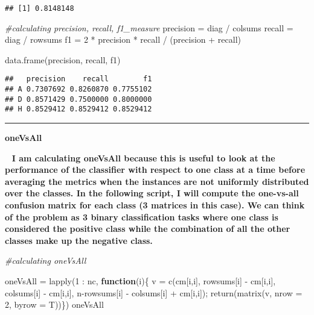 \documentclass[
]{article}
\newenvironment{Shaded}{\begin{snugshade}}{\end{snugshade}}
\newcommand{\AttributeTok}[1]{\textcolor[rgb]{0.77,0.63,0.00}{#1}}
\newcommand{\CommentTok}[1]{\textcolor[rgb]{0.56,0.35,0.01}{\textit{#1}}}
\newcommand{\ControlFlowTok}[1]{\textcolor[rgb]{0.13,0.29,0.53}{\textbf{#1}}}
\newcommand{\DecValTok}[1]{\textcolor[rgb]{0.00,0.00,0.81}{#1}}
\newcommand{\FunctionTok}[1]{\textcolor[rgb]{0.00,0.00,0.00}{#1}}
\newcommand{\NormalTok}[1]{#1}
\newcommand{\OtherTok}[1]{\textcolor[rgb]{0.56,0.35,0.01}{#1}}
\newcommand{\SpecialCharTok}[1]{\textcolor[rgb]{0.00,0.00,0.00}{#1}}
\begin{document}
\begin{verbatim}
## [1] 0.8148148
\end{verbatim}

\begin{Shaded}
\begin{Highlighting}[]
\CommentTok{\#calculating precision, recall, f1\_measure}
\NormalTok{precision }\OtherTok{=}\NormalTok{ diag }\SpecialCharTok{/}\NormalTok{ colsums }
\NormalTok{recall }\OtherTok{=}\NormalTok{ diag }\SpecialCharTok{/}\NormalTok{ rowsums }
\NormalTok{f1 }\OtherTok{=} \DecValTok{2} \SpecialCharTok{*}\NormalTok{ precision }\SpecialCharTok{*}\NormalTok{ recall }\SpecialCharTok{/}\NormalTok{ (precision }\SpecialCharTok{+}\NormalTok{ recall) }

\FunctionTok{data.frame}\NormalTok{(precision, recall, f1) }
\end{Highlighting}
\end{Shaded}

\begin{verbatim}
##   precision    recall        f1
## A 0.7307692 0.8260870 0.7755102
## D 0.8571429 0.7500000 0.8000000
## H 0.8529412 0.8529412 0.8529412
\end{verbatim}

\begin{center}\rule{0.5\linewidth}{0.5pt}\end{center}

\textbf{oneVsAll}

~ \textbf{I am calculating oneVsAll because this is useful to look at
the performance of the classifier with respect to one class at a time
before averaging the metrics when the instances are not uniformly
distributed over the classes. In the following script, I will compute
the one-vs-all confusion matrix for each class (3 matrices in this
case). We can think of the problem as 3 binary classification tasks
where one class is considered the positive class while the combination
of all the other classes make up the negative class.}

\begin{Shaded}
\begin{Highlighting}[]
\CommentTok{\#calculating  oneVsAll}

\NormalTok{oneVsAll }\OtherTok{=} \FunctionTok{lapply}\NormalTok{(}\DecValTok{1} \SpecialCharTok{:}\NormalTok{ nc,}
                      \ControlFlowTok{function}\NormalTok{(i)\{}
\NormalTok{                        v }\OtherTok{=} \FunctionTok{c}\NormalTok{(cm[i,i],}
\NormalTok{                              rowsums[i] }\SpecialCharTok{{-}}\NormalTok{ cm[i,i],}
\NormalTok{                              colsums[i] }\SpecialCharTok{{-}}\NormalTok{ cm[i,i],}
\NormalTok{                              n}\SpecialCharTok{{-}}\NormalTok{rowsums[i] }\SpecialCharTok{{-}}\NormalTok{ colsums[i] }\SpecialCharTok{+}\NormalTok{ cm[i,i]);}
                        \FunctionTok{return}\NormalTok{(}\FunctionTok{matrix}\NormalTok{(v, }\AttributeTok{nrow =} \DecValTok{2}\NormalTok{, }\AttributeTok{byrow =}\NormalTok{ T))\})}
\NormalTok{oneVsAll}
\end{Highlighting}
\end{Shaded}
\end{document}
